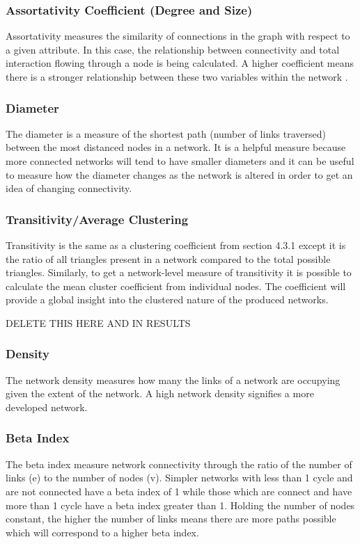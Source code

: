 \documentclass[12pt,a4paper]{thesis}
\begin{document}
\subsubsection{Assortativity Coefficient (Degree and Size)}
Assortativity measures the similarity of connections in the graph with respect to a given attribute. In this case, the relationship between connectivity and total interaction flowing through a node is being calculated. A higher coefficient means there is a stronger relationship between these two variables within the network \citeyearpar{New03a}. 

\subsubsection{Diameter}
The diameter is a measure of the shortest path (number of links traversed) between the most distanced nodes in a network. It is a helpful measure because more connected networks will tend to have smaller diameters and it can be useful to measure how the diameter changes as the network is altered in order to get an idea of changing connectivity. 


\subsubsection{Transitivity/Average Clustering}
Transitivity is the same as a clustering coefficient from section 4.3.1  except it is the ratio of all triangles present in a network compared to the total possible triangles. Similarly, to get a network-level measure of transitivity it is possible to calculate the mean cluster coefficient from individual nodes. The coefficient will provide a global insight into the clustered nature of the produced networks.

DELETE THIS HERE AND IN RESULTS
\subsubsection{Density}
The network density measures how many the links of a network are occupying given the extent of the network. A high network density signifies a more developed network. 

\subsubsection{Beta Index}
The beta index measure network connectivity through the ratio of the number of links (e) to the number of nodes (v). Simpler networks with less than 1 cycle and are not connected have a beta index of 1 while those which are connect and have more than 1 cycle have a beta index greater than 1. Holding the number of nodes constant, the higher the number of links means there are more paths possible which will correspond to a higher beta index. 
\end{document}
